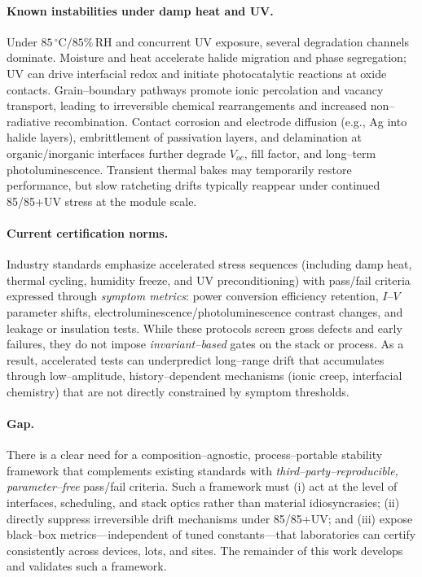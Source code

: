 \documentclass[12pt]{article}
\begin{document}
\paragraph{Known instabilities under damp heat and UV.}
Under $85\,^{\circ}\mathrm{C}/85\%\,\mathrm{RH}$ and concurrent UV exposure, several degradation channels dominate. Moisture and heat accelerate halide migration and phase segregation; UV can drive interfacial redox and initiate photocatalytic reactions at oxide contacts. Grain--boundary pathways promote ionic percolation and vacancy transport, leading to irreversible chemical rearrangements and increased non--radiative recombination. Contact corrosion and electrode diffusion (e.g., Ag into halide layers), embrittlement of passivation layers, and delamination at organic/inorganic interfaces further degrade $V_{\!oc}$, fill factor, and long--term photoluminescence. Transient thermal bakes may temporarily restore performance, but slow ratcheting drifts typically reappear under continued 85/85+UV stress at the module scale.

\paragraph{Current certification norms.}
Industry standards emphasize accelerated stress sequences (including damp heat, thermal cycling, humidity freeze, and UV preconditioning) with pass/fail criteria expressed through \emph{symptom metrics}: power conversion efficiency retention, $I$--$V$ parameter shifts, electroluminescence/photoluminescence contrast changes, and leakage or insulation tests. While these protocols screen gross defects and early failures, they do not impose \emph{invariant--based} gates on the stack or process. As a result, accelerated tests can underpredict long--range drift that accumulates through low--amplitude, history--dependent mechanisms (ionic creep, interfacial chemistry) that are not directly constrained by symptom thresholds.

\paragraph{Gap.}
There is a clear need for a composition--agnostic, process--portable stability framework that complements existing standards with \emph{third--party--reproducible, parameter--free} pass/fail criteria. Such a framework must (i) act at the level of interfaces, scheduling, and stack optics rather than material idiosyncrasies; (ii) directly suppress irreversible drift mechanisms under 85/85+UV; and (iii) expose black--box metrics---independent of tuned constants---that laboratories can certify consistently across devices, lots, and sites. The remainder of this work develops and validates such a framework.
\end{document}
